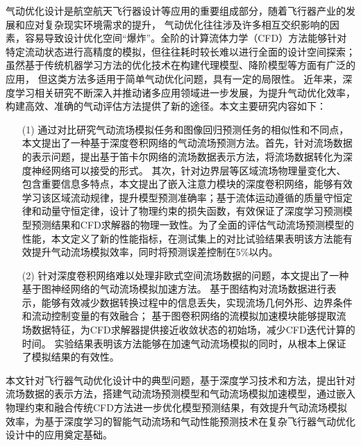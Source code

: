 \begin{cabstract}

气动优化设计是航空航天飞行器设计等应用的重要组成部分，随着飞行器产业的发展和应对复杂现实环境需求的提升，
气动优化往往涉及许多相互交织影响的因素，容易导致设计优化空间“爆炸”。全阶的计算流体力学（CFD）方法能够针对特定流动状态进行高精度的模拟，但往往耗时较长难以进行全面的设计空间探索；虽然基于传统机器学习方法的优化技术在构建代理模型、降阶模型等方面有广泛的应用，
但这类方法多适用于简单气动优化问题，具有一定的局限性。
近年来，深度学习相关研究不断深入并推动诸多应用领域进一步发展，为提升气动优化效率，
构建高效、准确的气动评估方法提供了新的途径。本文主要研究内容如下：

\begin{itemize}
	\item[(1)] 通过对比研究气动流场模拟任务和图像回归预测任务的相似性和不同点，本文提出了一种基于深度卷积网络的气动流场预测方法。首先，针对流场数据的表示问题，提出基于笛卡尔网络的流场数据表示方法，将流场数据转化为深度神经网络可以接受的形式。
	其次，针对边界层等区域流场物理量变化大、包含重要信息多特点，本文提出了嵌入注意力模块的深度卷积网络，能够有效学习该区域流动规律，提升模型预测准确率；基于流体运动遵循的质量守恒定律和动量守恒定律，设计了物理约束的损失函数，有效保证了深度学习预测模型预测结果和CFD求解器的物理一致性。为了全面的评估气动流场预测模型的性能，本文定义了新的性能指标，在测试集上的对比试验结果表明该方法能有效提升气动流场模拟效率，同时将预测误差控制在5\%以内。
	\item[(2)] 针对深度卷积网络难以处理非欧式空间流场数据的问题，本文提出了一种基于图神经网络的气动流场模拟加速方法。
	基于图结构对流场数据进行表示，能够有效减少数据转换过程中的信息丢失，实现流场几何外形、边界条件和流动控制变量的有效融合；
	基于图卷积网络的流模拟加速模块能够提取流场数据特征，为CFD求解器提供接近收敛状态的初始场，减少CFD迭代计算的时间。
	实验结果表明该方法能够在加速气动流场模拟的同时，从根本上保证了模拟结果的有效性。
	
\end{itemize}

本文针对飞行器气动优化设计中的典型问题，基于深度学习技术和方法，提出针对流场数据的表示方法，搭建气动流场预测模型和气动流场模拟加速模型，通过嵌入物理约束和融合传统CFD方法进一步优化模型预测结果，有效提升气动流场模拟效率，为基于深度学习的智能气动流场和气动性能预测技术在复杂飞行器气动优化设计中的应用奠定基础。

\end{cabstract}



